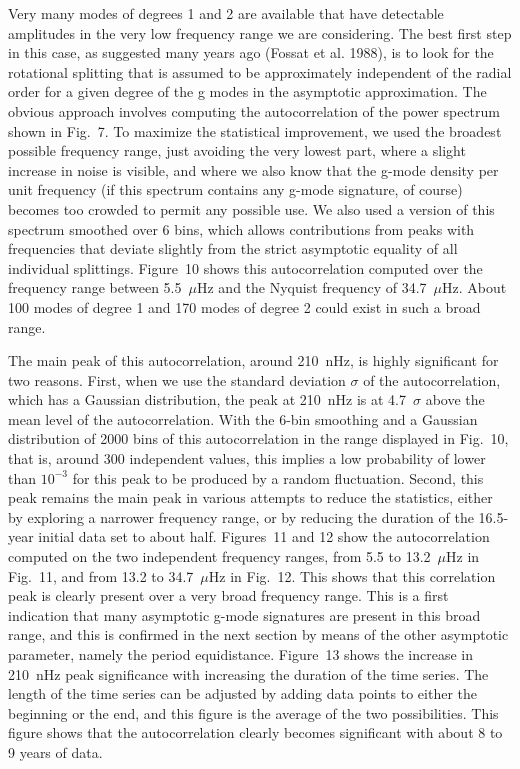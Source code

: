 \documentclass[bibyear]{aa}
\begin{document}
Very many modes of degrees 1 and 2 are available that have detectable amplitudes in the very low  frequency range we are considering.  The best first step in this case, as suggested many years ago (Fossat et al. 1988),  is to look for the rotational splitting that is assumed to be approximately independent of the radial order for a given degree of the g modes in the asymptotic approximation. The obvious approach involves computing the autocorrelation of the power spectrum shown in Fig.~7. To maximize the statistical improvement, we used the broadest possible frequency range, just avoiding the very lowest part, where a slight increase in noise is visible, and where we also know that the g-mode density per unit frequency (if this spectrum contains any g-mode signature, of course) becomes too crowded to permit any possible use. We also used a version of this spectrum smoothed over 6 bins, which allows contributions from peaks with frequencies that deviate slightly from the strict asymptotic equality of all individual splittings. Figure~10 shows this autocorrelation computed over the  frequency  range between 5.5~$\mu$Hz and the Nyquist frequency of 34.7~$\mu$Hz.  About 100 modes of degree 1 and 170 modes of degree 2 could exist in such a broad range.


The main peak of this autocorrelation, around  210~nHz, is highly significant for two reasons. First, when we use the standard deviation $\sigma$ of the autocorrelation, which has a Gaussian distribution, the peak at 210~nHz is at 4.7~$\sigma$ above the mean level of the autocorrelation. With the 6-bin smoothing and a Gaussian distribution of 2000 bins of this autocorrelation in the range displayed in Fig.~10, that is, around 300 independent values, this implies a low probability of lower than $10^{-3}$  for this peak to be produced by a random fluctuation. Second, this peak remains the main peak in various attempts to reduce the statistics, either by exploring a narrower frequency range, or by reducing the duration of the 16.5-year initial data set to about half. Figures~11 and 12 show the autocorrelation computed on the two independent frequency ranges, from 5.5 to 13.2~$\mu$Hz in Fig.~11, and from 13.2 to 34.7~$\mu$Hz in Fig.~12. This shows
that this correlation peak is clearly present over a very broad frequency range.
This is a first indication that many asymptotic g-mode signatures are present in this broad range, and this is confirmed in the next section by means of the other asymptotic parameter, namely the period equidistance.
 Figure~13 shows the increase in 210~nHz peak significance with increasing the duration of the time series. The length of the time series can be adjusted by adding data points to either the beginning or the end, and this figure is the average of the two possibilities. This figure shows that the autocorrelation clearly becomes significant with about 8 to 9 years of data. 
\end{document}
